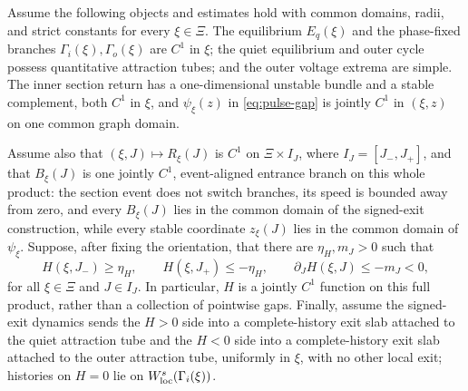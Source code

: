 \begin{theorem}\label{thm:pulse-completion}
Assume the following objects and estimates hold with common domains, radii,
and strict constants for every \(\xi\in\Xi\).  The equilibrium
\(E_q(\xi)\) and the phase-fixed branches
\(\Gamma_i(\xi),\Gamma_o(\xi)\) are \(C^1\) in \(\xi\); the quiet
equilibrium and outer cycle possess quantitative attraction tubes; and the
outer voltage extrema are simple.  The inner section return has a
one-dimensional unstable bundle and a stable complement, both \(C^1\) in
\(\xi\), and \(\psi_\xi(z)\) in \cref{eq:pulse-gap} is jointly \(C^1\)
in \((\xi,z)\) on one common graph domain.

Assume also that \((\xi,J)\mapsto R_\xi(J)\) is \(C^1\) on
\(\Xi\times I_J\), where \(I_J=[J_-,J_+]\), and that
\(B_\xi(J)\) is one jointly \(C^1\), event-aligned entrance branch on this
whole product: the section event does not switch branches, its speed is
bounded away from zero, and every \(B_\xi(J)\) lies in the common domain of
the signed-exit construction, while every stable coordinate \(z_\xi(J)\)
lies in the common domain of \(\psi_\xi\).  Suppose, after fixing
the orientation, that there are \(\eta_H,m_J>0\) such that
\begin{equation}
 H(\xi,J_-)\ge\eta_H,\qquad H(\xi,J_+)\le-\eta_H,
 \qquad \partial_JH(\xi,J)\le-m_J<0,                 \label{eq:gap-crossing}
\end{equation}
for all \(\xi\in\Xi\) and \(J\in I_J\).  In particular, \(H\) is a
jointly \(C^1\) function on this full product, rather than a collection of
pointwise gaps.  Finally, assume the signed-exit
dynamics sends the \(H>0\) side into a complete-history exit slab attached
to the quiet attraction tube and the \(H<0\) side into a complete-history
exit slab attached to the outer attraction tube, uniformly in \(\xi\),
with no other local exit; histories on \(H=0\) lie on
\(W^s_{\rm loc}(\Gamma_i(\xi))\).


\end{theorem}
